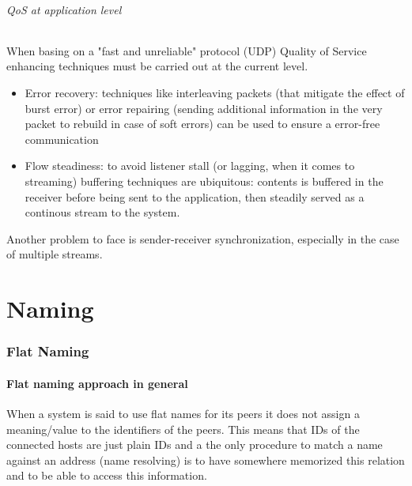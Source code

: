 \documentclass[10pt,a4paper]{article}
\begin{document}
			\paragraph{QoS at application level}
				When basing on a "fast and unreliable" protocol (UDP) Quality of Service enhancing techniques must be carried out at the current level.
				\begin{itemize}
					\item Error recovery: techniques like interleaving packets (that mitigate the effect of burst error) or error repairing (sending additional information in the very packet to rebuild in case of soft errors) can be used to ensure a error-free communication
					\item Flow steadiness: to avoid listener stall (or lagging, when it comes to streaming) buffering techniques are ubiquitous: contents is buffered in the receiver before being sent to the application, then steadily served as a continous stream to the system.
				\end{itemize}
				Another problem to face is sender-receiver synchronization, especially in the case of multiple streams.
				
	\part{Naming}
		\section{Flat Naming}			
			\subsection{Flat naming approach in general}
				When a system is said to use flat names for its peers it does not assign a meaning/value to the identifiers of the peers. This means that IDs of the connected hosts are just plain IDs and a the only procedure to match a name against an address (name resolving) is to have somewhere memorized this relation and to be able to access this information.
			
\end{document}
